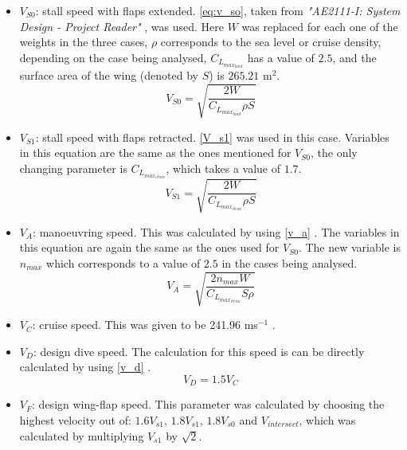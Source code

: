 \begin{itemize}
    \item $V_{S0}$: stall speed with flaps extended. \autoref{eq:v_so}, taken from \textit{"AE2111-I: System Design - Project Reader" } \cite{Timmer2024AE2111-IReader}, was used. Here $W$ was replaced for each one of the weights in the three cases, $\rho$ corresponds to the sea level or cruise density, depending on the case being analysed, $C_{L_{max _{land}}}$ has a value of $2.5$, and the surface area of the wing (denoted by $S$) is $265.21$ m$^2$. %
    \begin{equation}
    \label{eq:v_so}
        V_{S0} = \sqrt{\frac{2W}{C_{L_{max _{land}}} \rho S}} 
    \end{equation}
    \item $V_{S1}$: stall speed with flaps retracted. \autoref{V_s1} \cite{Timmer2024AE2111-IReader} was used in this case. Variables in this equation are the same as the ones mentioned for $V_{S0}$, the only changing parameter is $C_{L_{max _{clean}}}$, which takes a value of $1.7$.
    \begin{equation}
    \label{V_s1}
         V_{S1} = \sqrt{\frac{2W}{C_{L_{max _{clean}}} \rho S}}
    \end{equation}
    \item $V_A$: manoeuvring speed. This was calculated by using \autoref{v_a} \cite{Timmer2024AE2111-IReader}. The variables in this equation are again the same as the ones used for $V_{S0}$. The new variable is $n_{max}$ which corresponds to a value of $2.5$ in the cases being analysed. 
    \begin{equation}
    \label{v_a}
        V_A = \sqrt{\frac{2n_{max}W}{C_{L_{max_{clean}}}S\rho}}
    \end{equation}
    \item $V_C$: cruise speed. This was given to be 241.96 ms$^{-1}$ \cite{Timmer2024AE2111-IReader}.
    \item $V_D$: design dive speed. The calculation for this speed is can be directly calculated by using \autoref{v_d} \cite{Timmer2024AE2111-IReader}.
    \begin{equation}
    \label{v_d}
        V_D = 1.5V_C
    \end{equation}
    
    \item $V_F$: design wing-flap speed. This parameter was calculated by choosing the highest velocity out of: $1.6V_{s1}$, $1.8V_{s1}$, $1.8V_{s0}$ and $V_{intersect}$, which was calculated by multiplying $V_{s1}$ by $\sqrt{2}$.
    

\end{itemize}
